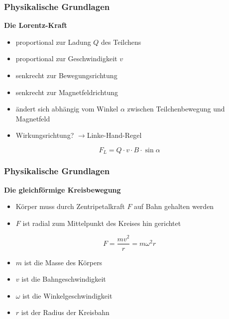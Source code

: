 \mode*
\begin{frame}
  \frametitle{Physikalische Grundlagen}
  \textbf{Die Lorentz-Kraft}
  \begin{itemize}
    \item proportional zur Ladung \(Q\) des Teilchens
    \item proportional zur Geschwindigkeit \(v\)
    \item senkrecht zur Bewegungsrichtung
    \item senkrecht zur Magnetfeldrichtung
    \item \"andert sich abh\"angig vom Winkel \(\alpha\) zwischen Teilchenbewegung und Magnetfeld
    \item Wirkungsrichtung? \(\rightarrow\)Linke-Hand-Regel
  \end{itemize}
  \vspace*{\fill}
  \begin{equation*}
    \label{eq:lorentz_abs}
    F_L = Q \cdot v \cdot B \cdot \sin{\alpha}
  \end{equation*}
  \vspace*{\fill}
\end{frame}

\begin{frame}
  \frametitle{Physikalische Grundlagen}
  \textbf{Die gleichf\"ormige Kreisbewegung}
  \begin{itemize}
    \item K\"orper muss durch Zentripetalkraft \(F\) auf Bahn gehalten werden
    \item \(F\) ist radial zum Mittelpunkt des Kreises hin gerichtet
  \end{itemize}
  \vspace*{\fill}
  \begin{equation*}
    \label{eq:zentripetalkraft}
    F = \frac{mv^2}{r} = m\omega^2r
  \end{equation*}
  \vspace*{\fill}
  \begin{itemize}
    \item \(m\) ist die Masse des K\"orpers
    \item \(v\) ist die Bahngeschwindigkeit
    \item \(\omega\) ist die Winkelgeschwindigkeit
    \item \(r\) ist der Radius der Kreisbahn
  \end{itemize}
\end{frame}

